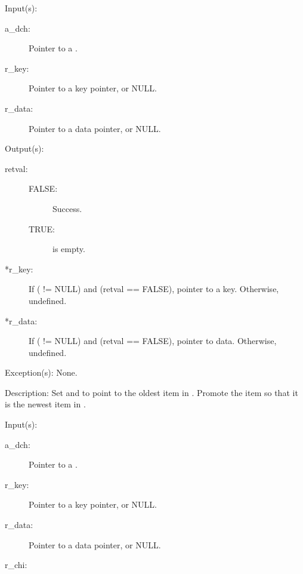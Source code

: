 \begin{capi}
	\begin{capilist}
	\item[Input(s): ]
		\begin{description}\item[]
		\item[a\_dch: ]
			Pointer to a .
		\item[r\_key: ]
			Pointer to a key pointer, or NULL.
		\item[r\_data: ]
			Pointer to a data pointer, or NULL.
		\end{description}
	\item[Output(s): ]
		\begin{description}\item[]
		\item[retval: ]
			\begin{description}\item[]
			\item[FALSE: ]
				Success.
			\item[TRUE: ]
				 is empty.
			\end{description}
		\item[*r\_key: ]
			If ( != NULL) and (retval == FALSE),
			pointer to a key.  Otherwise, undefined.
		\item[*r\_data: ]
			If ( != NULL) and (retval == FALSE),
			pointer to data.  Otherwise, undefined.
		\end{description}
	\item[Exception(s): ] None.
	\item[Description: ]
		Set  and  to point to the oldest
		item in .  Promote the item so that it is the
		newest item in .
	\end{capilist}
\label{dch_remove_iterate}
	\begin{capilist}
	\item[Input(s): ]
		\begin{description}\item[]
		\item[a\_dch: ]
			Pointer to a \classname{dch}.
		\item[r\_key: ]
			Pointer to a key pointer, or NULL.
		\item[r\_data: ]
			Pointer to a data pointer, or NULL.
		\item[r\_chi: ]

\end{description}
\end{capilist}
\end{capi}
